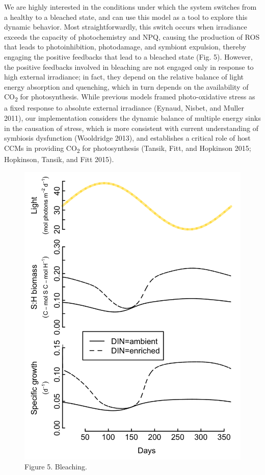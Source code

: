 \documentclass[]{elsarticle} %
\makeatletter
\def\maxwidth{\ifdim\Gin@nat@width>\linewidth\linewidth
\else\Gin@nat@width\fi}
\let\Oldincludegraphics\includegraphics
\renewcommand{\includegraphics}[1]{\Oldincludegraphics[width=\maxwidth]{#1}}
\makeatother
\begin{document}
We are highly interested in the conditions under which the system
switches from a healthy to a bleached state, and can use this model as a
tool to explore this dynamic behavior. Most straightforwardly, this
switch occurs when irradiance exceeds the capacity of photochemistry and
NPQ, causing the production of ROS that leads to photoinhibition,
photodamage, and symbiont expulsion, thereby engaging the positive
feedbacks that lead to a bleached state (Fig. 5). However, the positive
feedbacks involved in bleaching are not engaged only in response to high
external irradiance; in fact, they depend on the relative balance of
light energy absorption and quenching, which in turn depends on the
availability of CO\textsubscript{2} for photosynthesis. While previous
models framed photo-oxidative stress as a fixed response to absolute
external irradiance (Eynaud, Nisbet, and Muller 2011), our
implementation considers the dynamic balance of multiple energy sinks in
the causation of stress, which is more consistent with current
understanding of symbiosis dysfunction (Wooldridge 2013), and
establishes a critical role of host CCMs in providing
CO\textsubscript{2} for photosynthesis (Tansik, Fitt, and Hopkinson
2015; Hopkinson, Tansik, and Fitt 2015).

\begin{figure}[htbp]
\centering
\includegraphics{../img/Fig5.png}
\caption{Figure 5. Bleaching.}
\end{figure}
\end{document}
